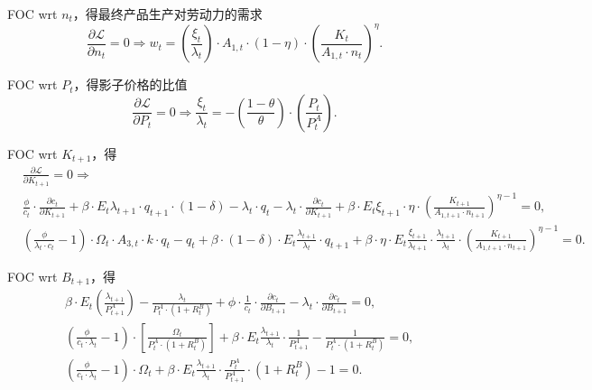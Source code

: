 FOC wrt $n_t$，得最终产品生产对劳动力的需求
\begin{equation}
\label{hh-opt-wrt-n}
\frac{\partial{\mathcal{L}}}{\partial{n_t}} = 0 \Rightarrow w_t = \left(\frac{\xi_t}{\lambda_t}\right) \cdot A_{1,t} \cdot \left(1-\eta \right) \cdot \left(\frac{K_{t}}{A_{1,t} \cdot n_t}\right)^{\eta}.
\end{equation}

FOC wrt $P_t$，得影子价格的比值
\begin{equation}
\label{hh-opt-wrt-p}
\frac{\partial{\mathcal{L}}}{\partial{P_t}} = 0 \Rightarrow \frac{\xi_t}{\lambda_t} = - \left(\frac{1- \theta} {\theta}\right) \cdot \left(\frac{P_t}{P_t^A} \right).
\end{equation}

FOC wrt $K_{t+1}$，得
\begin{equation}
\label{hh-opt-wrt-k}
\begin{split}
&\frac{\partial{\mathcal{L}}}{\partial{K_{t+1}}} = 0 \Rightarrow \\
&\frac{\phi}{c_t} \cdot \frac{\partial c_t}{\partial K_{t+1}} + \beta \cdot E_t \lambda_{t+1} \cdot q_{t+1} \cdot (1-\delta) - \lambda_t \cdot q_t - \lambda_t \cdot \frac{\partial c_t}{\partial K_{t+1}} + \beta \cdot E_t \xi_{t+1} \cdot \eta \cdot \left(\frac{K_{t+1}}{A_{1,t+1} \cdot n_{t+1}}\right)^{\eta - 1} = 0, \\
& \left(\frac{\phi}{\lambda_t \cdot c_t} - 1\right) \cdot \Omega_t \cdot A_{3,t} \cdot k \cdot q_t - q_t  + \beta \cdot \left(1-\delta \right) \cdot E_t \frac{\lambda_{t+1}}{\lambda_t} \cdot q_{t+1} + \beta \cdot \eta \cdot E_t \frac{\xi_{t+1}}{\lambda_{t+1}} \cdot \frac{\lambda_{t+1}}{\lambda_t} \cdot \left(\frac{K_{t+1}}{A_{1,t+1} \cdot n_{t+1}}\right)^{\eta - 1} = 0.
\end{split}
\end{equation}

FOC wrt $B_{t+1}$，得
\begin{equation}
\label{hh-opt-wrt-b}
\begin{split}
& \beta \cdot E_t \left(\frac{\lambda_{t+1}}{P_{t+1}^A}\right) - \frac{\lambda_t}{P_t^A \cdot \left(1 + R_t^B \right)} + \phi \cdot \frac{1}{c_t} \cdot \frac{\partial c_t}{\partial B_{t+1}} - \lambda_t \cdot \frac{\partial c_t}{\partial B_{t+1}} = 0, \\
& \left(\frac{\phi}{c_t \cdot \lambda_t} - 1 \right) \cdot \left[ \frac{\Omega_t}{P_t^A \cdot \left(1 + R_t^B \right)}\right] + \beta \cdot E_t \frac{\lambda_{t+1}}{\lambda_t} \cdot \frac{1}{P_{t+1}^A} - \frac{1}{P_t^A \cdot \left(1 + R_t^B \right)} = 0, \\
& \left(\frac{\phi}{c_t \cdot \lambda_t} - 1 \right) \cdot \Omega_t + \beta \cdot E_t \frac{\lambda_{t+1}}{\lambda_t} \cdot \frac{P_t^A}{P_{t+1}^{A}} \cdot \left(1 + R_t^B \right) - 1 = 0.
\end{split}
\end{equation}

